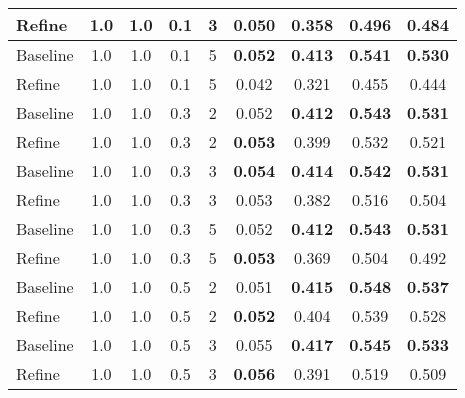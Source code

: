 \documentclass{article}
\begin{document}
\begin{tabular}{lcccccccc}
Refine   & 1.0 & 1.0 & 0.1 & 3 & 0.050 & 0.358 & 0.496 & 0.484 \\
\hline
Baseline & 1.0 & 1.0 & 0.1 & 5 & \textbf{0.052} & \textbf{0.413} & \textbf{0.541} & \textbf{0.530} \\
Refine   & 1.0 & 1.0 & 0.1 & 5 & 0.042 & 0.321 & 0.455 & 0.444 \\
\hline
Baseline & 1.0 & 1.0 & 0.3 & 2 & 0.052 & \textbf{0.412} & \textbf{0.543} & \textbf{0.531} \\
Refine   & 1.0 & 1.0 & 0.3 & 2 & \textbf{0.053} & 0.399 & 0.532 & 0.521 \\
\hline
Baseline & 1.0 & 1.0 & 0.3 & 3 & \textbf{0.054} & \textbf{0.414} & \textbf{0.542} & \textbf{0.531} \\
Refine   & 1.0 & 1.0 & 0.3 & 3 & 0.053 & 0.382 & 0.516 & 0.504 \\
\hline
Baseline & 1.0 & 1.0 & 0.3 & 5 & 0.052 & \textbf{0.412} & \textbf{0.543} & \textbf{0.531} \\
Refine   & 1.0 & 1.0 & 0.3 & 5 & \textbf{0.053} & 0.369 & 0.504 & 0.492 \\
\hline
Baseline & 1.0 & 1.0 & 0.5 & 2 & 0.051 & \textbf{0.415} & \textbf{0.548} & \textbf{0.537} \\
Refine   & 1.0 & 1.0 & 0.5 & 2 & \textbf{0.052} & 0.404 & 0.539 & 0.528 \\
\hline
Baseline & 1.0 & 1.0 & 0.5 & 3 & 0.055 & \textbf{0.417} & \textbf{0.545} & \textbf{0.533} \\
Refine   & 1.0 & 1.0 & 0.5 & 3 & \textbf{0.056} & 0.391 & 0.519 & 0.509 \\
\hline
\end{tabular}

\newpage
\end{document}
